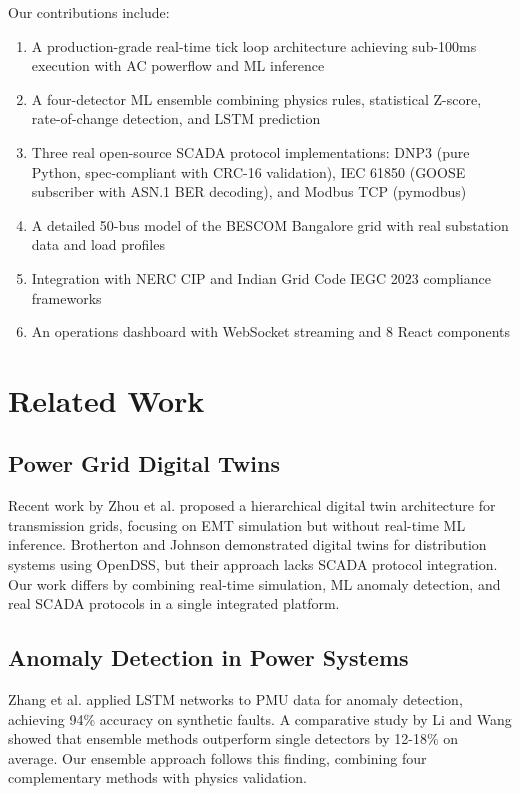 \documentclass[conference]{IEEEtran}
\begin{document}
Our contributions include:
\begin{enumerate}
\item A production-grade real-time tick loop architecture achieving sub-100ms execution with AC powerflow and ML inference
\item A four-detector ML ensemble combining physics rules, statistical Z-score, rate-of-change detection, and LSTM prediction
\item Three real open-source SCADA protocol implementations: DNP3 (pure Python, spec-compliant with CRC-16 validation), IEC 61850 (GOOSE subscriber with ASN.1 BER decoding), and Modbus TCP (pymodbus)
\item A detailed 50-bus model of the BESCOM Bangalore grid with real substation data and load profiles
\item Integration with NERC CIP and Indian Grid Code IEGC 2023 compliance frameworks
\item An operations dashboard with WebSocket streaming and 8 React components
\end{enumerate}

\section{Related Work}

\subsection{Power Grid Digital Twins}

Recent work by Zhou et al. \cite{zhou2021digital} proposed a hierarchical digital twin architecture for transmission grids, focusing on EMT simulation but without real-time ML inference. Brotherton and Johnson \cite{brotherton2020digital} demonstrated digital twins for distribution systems using OpenDSS, but their approach lacks SCADA protocol integration. Our work differs by combining real-time simulation, ML anomaly detection, and real SCADA protocols in a single integrated platform.

\subsection{Anomaly Detection in Power Systems}

Zhang et al. \cite{zhang2019anomaly} applied LSTM networks to PMU data for anomaly detection, achieving 94\% accuracy on synthetic faults. A comparative study by Li and Wang \cite{li2020ensemble} showed that ensemble methods outperform single detectors by 12-18\% on average. Our ensemble approach follows this finding, combining four complementary methods with physics validation.
\end{document}
